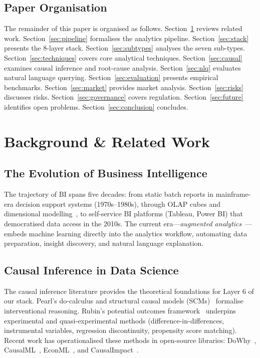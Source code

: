 \documentclass[12pt, a4paper]{article}
\begin{document}
\subsection{Paper Organisation}
The remainder of this paper is organised as follows. Section~\ref{sec:background} reviews related work. Section~\ref{sec:pipeline} formalises the analytics pipeline. Section~\ref{sec:stack} presents the 8-layer stack. Section~\ref{sec:subtypes} analyses the seven sub-types. Section~\ref{sec:techniques} covers core analytical techniques. Section~\ref{sec:causal} examines causal inference and root-cause analysis. Section~\ref{sec:nlq} evaluates natural language querying. Section~\ref{sec:evaluation} presents empirical benchmarks. Section~\ref{sec:market} provides market analysis. Section~\ref{sec:risks} discusses risks. Section~\ref{sec:governance} covers regulation. Section~\ref{sec:future} identifies open problems. Section~\ref{sec:conclusion} concludes.

\section{Background \& Related Work}\label{sec:background}

\subsection{The Evolution of Business Intelligence}
The trajectory of BI spans five decades: from static batch reports in mainframe-era decision support systems (1970s--1980s), through OLAP cubes and dimensional modelling~\citep{kimball2013data}, to self-service BI platforms (Tableau, Power BI) that democratised data access in the 2010s. The current era---\emph{augmented analytics}~\citep{gartner2024augmented}---embeds machine learning directly into the analytics workflow, automating data preparation, insight discovery, and natural language explanation.

\subsection{Causal Inference in Data Science}
The causal inference literature provides the theoretical foundations for Layer 6 of our stack. Pearl's do-calculus and structural causal models (SCMs)~\citep{pearl2009causality} formalise interventional reasoning. Rubin's potential outcomes framework~\citep{rubin2005causal} underpins experimental and quasi-experimental methods (difference-in-differences, instrumental variables, regression discontinuity, propensity score matching). Recent work has operationalised these methods in open-source libraries: DoWhy~\citep{sharma2020dowhy}, CausalML~\citep{chen2020causalml}, EconML~\citep{econml2019}, and CausalImpact~\citep{brodersen2015causalimpact}.
\end{document}
